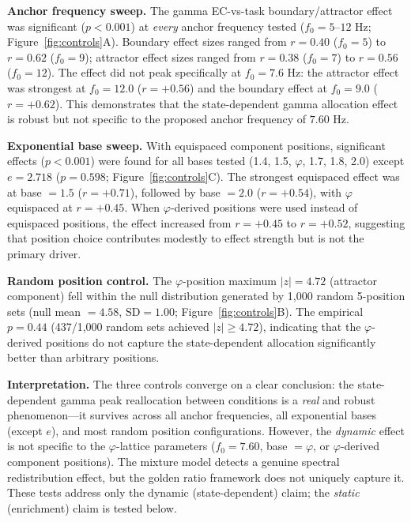 \documentclass[11pt,a4paper]{article}
\newcommand{\phisym}{\varphi}
\newcommand{\fzero}{f_0}
\begin{document}
\textbf{Anchor frequency sweep.} The gamma EC-vs-task boundary/attractor effect was significant ($p < 0.001$) at \emph{every} anchor frequency tested ($\fzero = 5$--$12$ Hz; Figure~\ref{fig:controls}A). Boundary effect sizes ranged from $r = 0.40$ ($\fzero = 5$) to $r = 0.62$ ($\fzero = 9$); attractor effect sizes ranged from $r = 0.38$ ($\fzero = 7$) to $r = 0.56$ ($\fzero = 12$). The effect did not peak specifically at $\fzero = 7.6$ Hz: the attractor effect was strongest at $\fzero = 12.0$ ($r = +0.56$) and the boundary effect at $\fzero = 9.0$ ($r = +0.62$). This demonstrates that the state-dependent gamma allocation effect is robust but not specific to the proposed anchor frequency of $7.60$ Hz.

\textbf{Exponential base sweep.} With equispaced component positions, significant effects ($p < 0.001$) were found for all bases tested (1.4, 1.5, $\phisym$, 1.7, 1.8, 2.0) except $e = 2.718$ ($p = 0.598$; Figure~\ref{fig:controls}C). The strongest equispaced effect was at base $= 1.5$ ($r = +0.71$), followed by base $= 2.0$ ($r = +0.54$), with $\phisym$ equispaced at $r = +0.45$. When $\phisym$-derived positions were used instead of equispaced positions, the effect increased from $r = +0.45$ to $r = +0.52$, suggesting that position choice contributes modestly to effect strength but is not the primary driver.

\textbf{Random position control.} The $\phisym$-position maximum $|z| = 4.72$ (attractor component) fell within the null distribution generated by 1,000 random 5-position sets (null mean $= 4.58$, $\text{SD} = 1.00$; Figure~\ref{fig:controls}B). The empirical $p = 0.44$ (437/1,000 random sets achieved $|z| \geq 4.72$), indicating that the $\phisym$-derived positions do not capture the state-dependent allocation significantly better than arbitrary positions.

\textbf{Interpretation.} The three controls converge on a clear conclusion: the state-dependent gamma peak reallocation between conditions is a \emph{real} and robust phenomenon---it survives across all anchor frequencies, all exponential bases (except $e$), and most random position configurations. However, the \emph{dynamic} effect is not specific to the $\phisym$-lattice parameters ($\fzero = 7.60$, base $= \phisym$, or $\phisym$-derived component positions). The mixture model detects a genuine spectral redistribution effect, but the golden ratio framework does not uniquely capture it. These tests address only the dynamic (state-dependent) claim; the \emph{static} (enrichment) claim is tested below.
\end{document}
